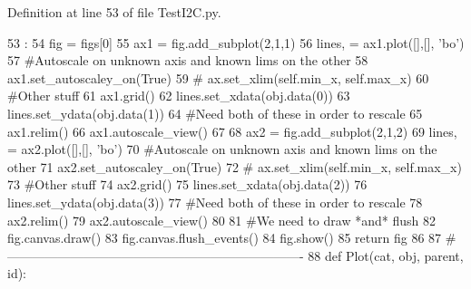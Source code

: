 Definition at line 53 of file TestI2C.py.


\begin{DoxyCode}
53                           :
54     fig = figs[0]
55     ax1 = fig.add_subplot(2,1,1)
56     lines, = ax1.plot([],[], 'bo')
57     #Autoscale on unknown axis and known lims on the other
58     ax1.set_autoscaley_on(True)
59 #    ax.set_xlim(self.min_x, self.max_x)
60     #Other stuff
61     ax1.grid()        
62     lines.set_xdata(obj.data(0))
63     lines.set_ydata(obj.data(1))
64     #Need both of these in order to rescale
65     ax1.relim()
66     ax1.autoscale_view()
67 
68     ax2 = fig.add_subplot(2,1,2)
69     lines, = ax2.plot([],[], 'bo')
70     #Autoscale on unknown axis and known lims on the other
71     ax2.set_autoscaley_on(True)
72 #    ax.set_xlim(self.min_x, self.max_x)
73     #Other stuff
74     ax2.grid()        
75     lines.set_xdata(obj.data(2))
76     lines.set_ydata(obj.data(3))
77     #Need both of these in order to rescale
78     ax2.relim()
79     ax2.autoscale_view()
80 
81     #We need to draw *and* flush
82     fig.canvas.draw()
83     fig.canvas.flush_events()
84     fig.show()
85     return fig
86     
87 #----------------------------------------------------------------------
88 
def Plot(cat, obj, parent, id):
\end{DoxyCode}

